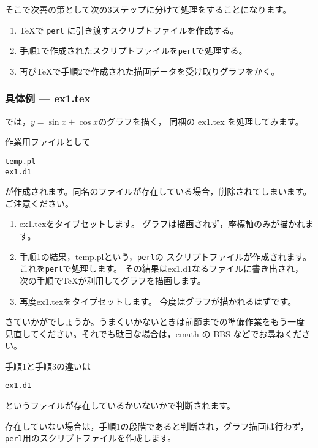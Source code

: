 \documentclass[a4j,fleqn]{jarticle}
\begin{document}
そこで次善の策として次の3ステップに分けて処理をすることになります。
\begin{enumerate}[手順 1.~]
  \item \TeX で \texttt{perl} に引き渡すスクリプトファイルを作成する。
  \item 手順1で作成されたスクリプトファイルを\texttt{perl}で処理する。
  \item 再び\TeX で手順2で作成された描画データを受け取りグラフをかく。
\end{enumerate}

\subsubsection{具体例 --- ex1.tex}
では，$y=\sin x+\cos x$のグラフを描く，
同梱の \textsf{ex1.tex} を処理してみます。

作業用ファイルとして
\begin{jquote}
\begin{verbatim}
temp.pl
ex1.d1
\end{verbatim}
\end{jquote}
が作成されます。同名のファイルが存在している場合，削除されてしまいます。
ご注意ください。

\begin{enumerate}[手順 1.~]
  \item \textsf{ex1.tex}をタイプセットします。
    グラフは描画されず，座標軸のみが描かれます。
  \item 手順1の結果，\textsf{temp.pl}という，\texttt{perl}の
    スクリプトファイルが作成されます。これを\texttt{perl}で処理します。
    その結果は\textsf{ex1.d1}なるファイルに書き出され，
    次の手順で\TeX が利用してグラフを描画します。
  \item 再度{ex1.tex}をタイプセットします。
    今度はグラフが描かれるはずです。
\end{enumerate}
さていかがでしょうか。うまくいかないときは前節までの準備作業をもう一度
見直してください。それでも駄目な場合は，emath の BBS などでお尋ねください。

手順1と手順3の違いは
\begin{jquote}
\begin{verbatim}
ex1.d1
\end{verbatim}
\end{jquote}
というファイルが存在しているかいないかで判断されます。

存在していない場合は，手順1の段階であると判断され，グラフ描画は行わず，
\texttt{perl}用のスクリプトファイルを作成します。
\end{document}
